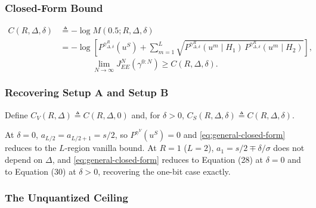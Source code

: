 \documentclass[11pt]{article}
\begin{document}
\subsubsection*{Closed-Form Bound}

\begin{align}
C(R,\Delta,\delta) &\triangleq -\log M(0.5; R,\Delta,\delta) \nonumber \\
&= -\log\left[P^{\gamma^R_{\Delta,\delta}}(u^S)
+ \sum_{m=1}^{L} \sqrt{P^{\gamma^R_{\Delta,\delta}}(u^m\mid H_1)\,
P^{\gamma^R_{\Delta,\delta}}(u^m\mid H_2)}\right],
\label{eq:general-closed-form}
\end{align}
\begin{equation}
\lim_{N\to\infty} J_{EE}^N(\gamma^{0:N}) \ge C(R,\Delta,\delta).
\label{eq:general-closed-form-bound}
\end{equation}
 
\subsubsection*{Recovering Setup A and Setup B}
 
Define $C_V(R,\Delta) \triangleq C(R,\Delta,0)$ and, for $\delta>0$,
$C_S(R,\Delta,\delta) \triangleq C(R,\Delta,\delta)$.
 
At $\delta=0$, $a_{L/2}=a_{L/2+1}=s/2$, so $P^{\gamma^V}(u^S)=0$ and
\eqref{eq:general-closed-form} reduces to the $L$-region vanilla bound.
At $R=1$ ($L=2$), $a_1 = s/2 \mp \delta/\sigma$ does not depend on
$\Delta$, and \eqref{eq:general-closed-form} reduces to Equation (28) at
$\delta=0$ and to Equation (30) at $\delta>0$, recovering the one-bit
case exactly.

\subsubsection*{The Unquantized Ceiling}
\end{document}
